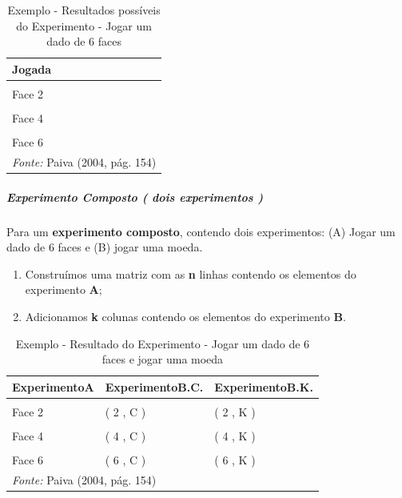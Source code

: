 \documentclass[
]{book}
\providecommand{\tightlist}{%
  \setlength{\itemsep}{0pt}\setlength{\parskip}{0pt}}
\begin{document}
\begin{table}

\caption{\label{tab:tabela3}Exemplo - Resultados possíveis do Experimento - Jogar um dado de 6 faces}
\centering
\begin{tabular}[t]{l}
\toprule
Jogada\\
\midrule
\cellcolor{gray!6}{Face 1}\\
Face 2\\
\cellcolor{gray!6}{Face 3}\\
Face 4\\
\cellcolor{gray!6}{Face 5}\\
\addlinespace
Face 6\\
\bottomrule
\multicolumn{1}{l}{\rule{0pt}{1em}\textit{Fonte: } Paiva (2004, pág. 154)}\\
\end{tabular}
\end{table}

\hypertarget{experimento-composto-dois-experimentos}{%
\subparagraph{Experimento Composto ( dois experimentos )}\label{experimento-composto-dois-experimentos}}

Para um \textbf{experimento composto}, contendo dois experimentos: (A) Jogar um dado de 6 faces e (B) jogar uma moeda.

\begin{enumerate}
\def\labelenumi{\arabic{enumi}.}
\tightlist
\item
  Construímos uma matriz com as \textbf{n} linhas contendo os elementos do experimento \textbf{A};
\item
  Adicionamos \textbf{k} colunas contendo os elementos do experimento \textbf{B}.
\end{enumerate}

\begin{table}

\caption{\label{tab:tabela1}Exemplo - Resultado do Experimento - Jogar um dado de 6 faces e jogar uma moeda}
\centering
\begin{tabular}[t]{lll}
\toprule
ExperimentoA & ExperimentoB.C. & ExperimentoB.K.\\
\midrule
\cellcolor{gray!6}{Face 1} & \cellcolor{gray!6}{( 1 , C )} & \cellcolor{gray!6}{( 1 , K )}\\
Face 2 & ( 2 , C ) & ( 2 , K )\\
\cellcolor{gray!6}{Face 3} & \cellcolor{gray!6}{( 3 , C )} & \cellcolor{gray!6}{( 3 , K )}\\
Face 4 & ( 4 , C ) & ( 4 , K )\\
\cellcolor{gray!6}{Face 5} & \cellcolor{gray!6}{( 5 , C )} & \cellcolor{gray!6}{( 5 , K )}\\
\addlinespace
Face 6 & ( 6 , C ) & ( 6 , K )\\
\bottomrule
\multicolumn{3}{l}{\rule{0pt}{1em}\textit{Fonte: } Paiva (2004, pág. 154)}\\
\end{tabular}
\end{table}
\end{document}
